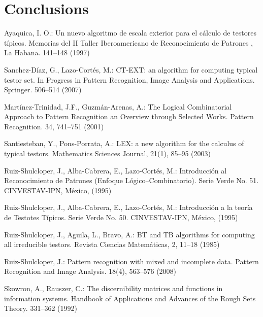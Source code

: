 \documentclass[citeauthoryear]{llncs}
\begin{document}
\section{Conclusions}
%
%
\begin{thebibliography}{}
%


	Ayaquica, I. O.:
	Un nuevo algoritmo de escala exterior para el c\'alculo de testores t\'ipicos.
	Memorias del II Taller Iberoamericano de Reconocimiento de Patrones , La
	Habana. 141--148 (1997)

	Sanchez-D\'iaz, G., Lazo-Cort\'es, M.:
	CT-EXT: an algorithm for computing typical testor set. 
	In Progress in Pattern Recognition, Image Analysis and Applications. Springer. 506--514 (2007)

	Mart\'inez-Trinidad, J.F., Guzm\'an-Arenas, A.: 
	The Logical Combinatorial Approach to Pattern Recognition an Overview through Selected Works. 
	Pattern Recognition. 34, 741--751 (2001)

	Santiesteban, Y., Pons-Porrata, A.:
	LEX: a new algorithm for the calculus of typical testors. 
	Mathematics Sciences Journal, 21(1), 85--95 (2003)

	Ruiz-Shulcloper, J., Alba-Cabrera, E., Lazo-Cort\'es, M.:
	Introducci\'{o}n al Reconocimiento de Patrones (Enfoque L\'{o}gico--Combinatorio). 
	Serie Verde No. 51. CINVESTAV-IPN, México, (1995)

	Ruiz-Shulcloper, J., Alba-Cabrera, E., Lazo-Cort\'es, M.:
	Introducci\'{o}n a la teor\'ia de Testotes T\'ipicos. 
	Serie Verde No. 50. CINVESTAV-IPN, México, (1995)
	
	Ruiz-Shulcloper, J., Aguila, L., Bravo, A.:
	BT and TB algorithms for computing all irreducible testors. 
	Revista Ciencias Matem\'{a}ticas, 2, 11--18 (1985)

	Ruiz-Shulcloper, J.:
	Pattern recognition with mixed and incomplete data. 
	Pattern Recognition and Image Analysis. 18(4), 563--576 (2008)

	Skowron, A., Rauszer, C.:
	The discernibility matrices and functions in information systems. 
	Handbook of Applications and Advances of the Rough Sets Theory. 331--362  (1992)
	
	
\end{thebibliography}

%
\end{document}
